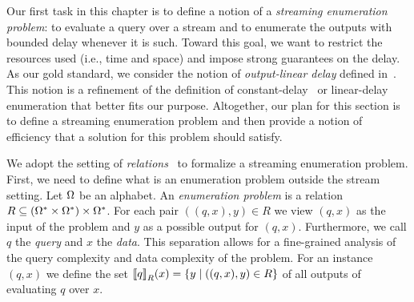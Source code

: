 


Our first task in this chapter is to define a notion of a \emph{streaming enumeration problem}: to evaluate a query over a stream and to enumerate the outputs with bounded delay whenever it is such. Toward this goal, we want to restrict the resources used (i.e., time and space) and impose strong guarantees on the delay. As our gold standard, we consider the notion of \emph{output-linear delay} defined in~\cite{FlorenzanoRUVV20}. This notion is a refinement of the definition of constant-delay~\cite{Segoufin13} or linear-delay~\cite{Courcelle09} enumeration that better fits our purpose. Altogether, our plan for this section is to define a streaming enumeration problem and then provide a notion of efficiency that a solution for this problem should satisfy. 

We adopt the setting of \emph{relations}~\cite{jerrum1986random,ArenasCJR19} to formalize a streaming enumeration problem. First, we need to define what is an enumeration problem outside the stream setting. 
Let $\Omega$  be an alphabet. An \emph{enumeration problem} is a relation $R\subseteq (\Omega^{*} \times \Omega^*) \times\Omega^{*}$. For each pair $((q, x), y) \in R$ we view $(q, x)$ as the input of the problem and $y$ as a possible output for $(q, x)$. 
Furthermore, we call $q$ the \emph{query} and $x$ the \emph{data}.
This separation allows for a fine-grained analysis of the query complexity and data complexity of the problem. 
For an instance $(q, x)$ we define the set ${\llbracket{q}\rrbracket}_{R}(x) = \{y \mid ((q,x), y)\in R\}$ of all outputs of evaluating $q$ over $x$.

